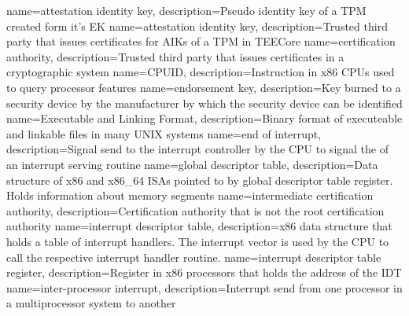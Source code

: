 
%
{
  name=attestation identity key,
  description={Pseudo identity key of a TPM created form it's EK}
}
{
  name=attestation identity key,
  description={Trusted third party that issues certificates for AIKs of a TPM in TEECore}
}
%
{
  name=certification authority,
  description={Trusted third party that issues certificates in a cryptographic system}
}
{
  name=CPUID,
  description={Instruction in x86 CPUs used to query processor features}
}
%
{
  name=endorsement key,
  description={Key burned to a security device by the manufacturer by which the security device can be identified}
}
{
  name=Executable and Linking Format,
  description={Binary format of executeable and linkable files in many UNIX systems}
}
{
  name=end of interrupt,
  description={Signal send to the interrupt controller by the CPU to signal the of an interrupt serving routine}
}
%
{
  name=global descriptor table,
  description={Data structure of x86 and x86\_64 ISAs pointed to by global descriptor table register.
  Holds information about memory segments}
}
%
{
  name=intermediate certification authority,
  description={Certification authority that is not the root certification authority}
}
{
  name=interrupt descriptor table,
  description={x86 data structure that holds a table of interrupt handlers. The interrupt vector is used by the CPU to
  call the respective interrupt handler routine.}
}
{
  name=interrupt descriptor table register,
  description={Register in x86 processors that holds the address of the IDT}
}
{
  name=inter-processor interrupt,
  description={Interrupt send from one processor in a multiprocessor system to another}
}
